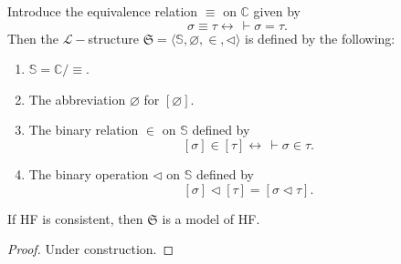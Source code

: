 \begin{definition}
    \label{def:stdModel}
    \leanok
    Introduce the equivalence relation $\equiv$ on $\mathbb{C}$ given by
    $$
    \sigma \equiv \tau \leftrightarrow \,\vdash \sigma = \tau.
    $$
    Then the $\mathcal{L}-$structure 
    $\mathfrak{S} = \langle\mathbb{S}, \varnothing, \in, \lhd \rangle$ is defined by the following:
    \begin{enumerate}
        \item $\mathbb{S} = \mathbb{C}/{\equiv}$.
        \item The abbreviation $\varnothing$ for $[\varnothing]$.
        \item The binary relation $\in$ on $\mathbb{S}$ defined by
                $$[\sigma] \in [\tau] \leftrightarrow \,\vdash \sigma \in \tau.$$
        \item The binary operation $\lhd$ on $\mathbb{S}$ defined by
                $$[\sigma] \lhd [\tau] = [\sigma \lhd \tau].$$
    \end{enumerate}
\end{definition}

\begin{theorem}
    \label{stdModel.model_of_consistent}
    \leanok
    If HF is consistent, then $\mathfrak{S}$ is a model of HF.
\end{theorem}

\begin{proof}
    Under construction.
\end{proof}